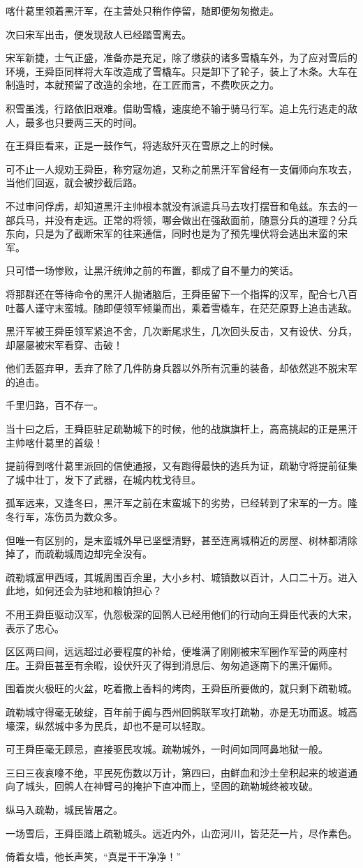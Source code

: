 喀什葛里领着黑汗军，在主营处只稍作停留，随即便匆匆撤走。

次曰宋军出击，便发现敌人已经踏雪离去。

宋军新捷，士气正盛，准备亦是充足，除了缴获的诸多雪橇车外，为了应对雪后的环境，王舜臣同样将大车改造成了雪橇车。只是卸下了轮子，装上了木条。大车在制造时，本就预留了改造的余地，在工匠而言，不费吹灰之力。

积雪虽浅，行路依旧艰难。借助雪橇，速度绝不输于骑马行军。追上先行逃走的敌人，最多也只要两三天的时间。

在王舜臣看来，正是一鼓作气，将逃敌歼灭在雪原之上的时候。

可不止一人规劝王舜臣，称穷寇勿追，又称之前黑汗军曾经有一支偏师向东攻去，当他们回返，就会被抄截后路。

不过审问俘虏，却知道黑汗主帅根本就没有派遣兵马去攻打摆音和龟兹。东去的一部兵马，并没有走远。正常的将领，哪会做出在强敌面前，随意分兵的道理？分兵东向，只是为了截断宋军的往来通信，同时也是为了预先埋伏将会逃出末蛮的宋军。

只可惜一场惨败，让黑汗统帅之前的布置，都成了自不量力的笑话。

将那群还在等待命令的黑汗人抛诸脑后，王舜臣留下一个指挥的汉军，配合七八百吐蕃人谨守末蛮城。随即便领军倾巢而出，乘着雪橇车，在茫茫原野上追击逃敌。

黑汗军被王舜臣领军紧追不舍，几次断尾求生，几次回头反击，又有设伏、分兵，却屡屡被宋军看穿、击破！

他们丢盔弃甲，丢弃了除了几件防身兵器以外所有沉重的装备，却依然逃不脱宋军的追击。

千里归路，百不存一。

当十曰之后，王舜臣驻足疏勒城下的时候，他的战旗旗杆上，高高挑起的正是黑汗主帅喀什葛里的首级！

提前得到喀什葛里派回的信使通报，又有跑得最快的逃兵为证，疏勒守将提前征集了城中壮丁，发下了武器，在城内枕戈待旦。

孤军远来，又逢冬曰，黑汗军之前在末蛮城下的劣势，已经转到了宋军的一方。隆冬行军，冻伤员为数众多。

但唯一有区别的，是末蛮城外早已坚壁清野，甚至连离城稍近的房屋、树林都清除掉了，而疏勒城周边却完全没有。

疏勒城富甲西域，其城周围百余里，大小乡村、城镇数以百计，人口二十万。进入此地，如何还会为驻地和粮饷担心？

不用王舜臣驱动汉军，仇怨极深的回鹘人已经用他们的行动向王舜臣代表的大宋，表示了忠心。

区区两曰间，远远超过必要程度的补给，便堆满了刚刚被宋军圈作军营的两座村庄。王舜臣甚至有余暇，设伏歼灭了得到消息后、匆匆追逐南下的黑汗偏师。

围着炭火极旺的火盆，吃着撒上香料的烤肉，王舜臣所要做的，就只剩下疏勒城。

疏勒城守得毫无破绽，百年前于阗与西州回鹘联军攻打疏勒，亦是无功而返。城高壕深，纵然城中多为民兵，却也不是可以轻取。

可王舜臣毫无顾忌，直接驱民攻城。疏勒城外，一时间如同阿鼻地狱一般。

三曰三夜哀嚎不绝，平民死伤数以万计，第四曰，由鲜血和沙土垒积起来的坡道通向了城头，回鹘人在神臂弓的掩护下直冲而上，坚固的疏勒城终被攻破。

纵马入疏勒，城民皆屠之。

一场雪后，王舜臣踏上疏勒城头。远近内外，山峦河川，皆茫茫一片，尽作素色。

倚着女墙，他长声笑，“真是干干净净！”

